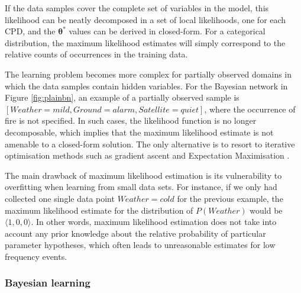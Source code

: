 If the data samples cover the complete set of variables in the model, this likelihood can be neatly decomposed in a set of local likelihoods, one for each CPD, and the $\boldsymbol\theta^*$ values can be derived in closed-form. For a categorical distribution,  the maximum likelihood estimates will simply correspond to the relative counts of occurrences in the training data. 


The learning problem becomes more complex for partially observed domains in which the data samples contain hidden variables.  For the Bayesian network in Figure \ref{fig:plainbn}, an example of a partially observed sample is $[ \mathit{Weather}\!=\!\mathit{mild}, \mathit{Ground}\!=\!alarm, \mathit{Satellite} \!=\!quiet]$, where the occurrence of fire is not specified.  In such cases, the likelihood function is no longer decomposable, which implies that the maximum likelihood estimate is not amenable to a closed-form solution. The only alternative is to resort to iterative optimisation methods such as gradient ascent \citep{binder1997} and Expectation Maximisation \citep{green1990}. 

The main drawback of maximum likelihood estimation is its vulnerability to overfitting when learning from small data sets. For instance, if we only had collected one single data point $\mathit{Weather}\!=\!\mathit{cold}$ for the previous example, the maximum likelihood estimate for the distribution of $P(\mathit{Weather})$ would be $\langle 1, 0,0\rangle$.  In other words, maximum likelihood estimation does not take into account any prior knowledge about the relative probability of particular parameter hypotheses, which often leads to unreasonable estimates for low frequency events. 

\subsubsection*{Bayesian learning}

